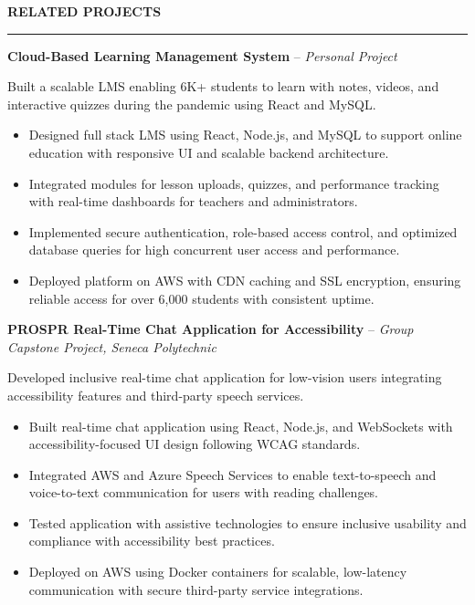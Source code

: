 \documentclass[10pt,letterpaper]{article}
\begin{document}
\vspace{6pt}

\textbf{RELATED PROJECTS}\\[-8pt]
\noindent\rule{\textwidth}{1pt}

\vspace{-2pt}

\textbf{Cloud-Based Learning Management System} -- \emph{Personal Project}

\vspace{-1pt}

Built a scalable LMS enabling 6K+ students to learn with notes, videos, and interactive quizzes during the pandemic using React and MySQL.
\vspace{-1pt}
\begin{itemize}
\item Designed full stack LMS using React, Node.js, and MySQL to support online education with responsive UI and scalable backend architecture.
\item Integrated modules for lesson uploads, quizzes, and performance tracking with real-time dashboards for teachers and administrators.
\item Implemented secure authentication, role-based access control, and optimized database queries for high concurrent user access and performance.
\item Deployed platform on AWS with CDN caching and SSL encryption, ensuring reliable access for over 6,000 students with consistent uptime.
\end{itemize}

\textbf{PROSPR  Real-Time Chat Application for Accessibility} -- \emph{Group Capstone Project, Seneca Polytechnic}

\vspace{-1pt}

Developed inclusive real-time chat application for low-vision users integrating accessibility features and third-party speech services.
\vspace{-1pt}
\begin{itemize}
\item Built real-time chat application using React, Node.js, and WebSockets with accessibility-focused UI design following WCAG standards.
\item Integrated AWS and Azure Speech Services to enable text-to-speech and voice-to-text communication for users with reading challenges.
\item Tested application with assistive technologies to ensure inclusive usability and compliance with accessibility best practices.
\item Deployed on AWS using Docker containers for scalable, low-latency communication with secure third-party service integrations.
\end{itemize}
\end{document}

